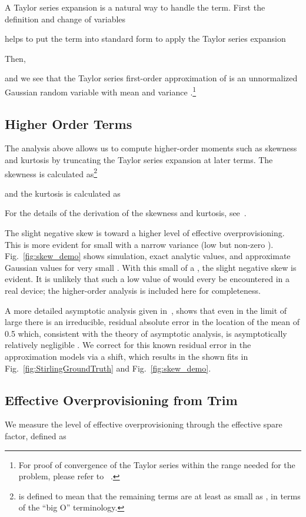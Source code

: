 \documentclass[prodmode,acmtos]{acmsmall}
\begin{document}
A Taylor series expansion is a natural way to handle the  term.  First the definition  and change of variables

helps to put the  term into standard form to apply the Taylor series expansion

Then,

and we see that the Taylor series first-order approximation of  is an unnormalized Gaussian random variable with mean  and variance .\footnote{For proof of convergence of the Taylor series within the range needed for the problem, please refer to ~\cite{frankie2012_acmse}.}

\subsection{Higher Order Terms}
The analysis above allows us to compute higher-order moments such as skewness and kurtosis by truncating the Taylor series expansion at later terms.  The skewness is calculated as\footnote{ is defined to mean that the remaining terms are at least as small as , in terms of the ``big O'' terminology.}

and the kurtosis is calculated as

For the details of the derivation of the skewness and kurtosis, see~\cite{TashaDissertation}.

The slight negative skew is toward a higher level of effective overprovisioning.  This is more evident for small  with a narrow variance (low but non-zero ).  Fig.~\ref{fig:skew_demo} shows simulation, exact analytic values, and approximate Gaussian values for very small .  With this small of a , the slight negative skew is evident.  It is unlikely that such a low value of  would every be encountered in a real device; the higher-order analysis is included here for completeness.

A more detailed asymptotic analysis given in~\cite{TashaDissertation}, shows that even in the limit of large  there is an irreducible, residual  absolute  error in the location of the mean of 0.5 which, consistent with the theory of asymptotic analysis,  is asymptotically relatively negligible . We correct for this known residual error in the approximation models via a shift, which results in the shown fits in Fig.~\ref{fig:StirlingGroundTruth} and Fig.~\ref{fig:skew_demo}.



\subsection{Effective Overprovisioning from Trim}
We measure the level of effective overprovisioning through the effective spare factor, defined as
\end{document}
